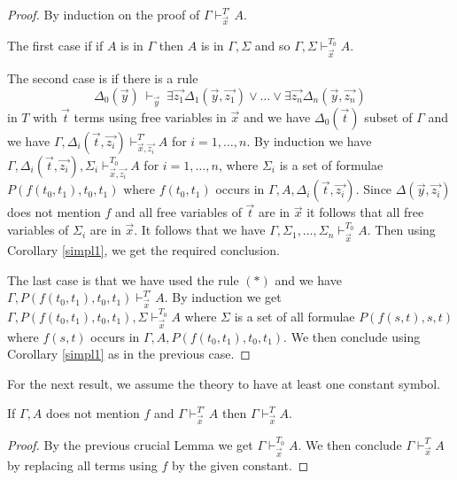 \documentclass[10pt,a4paper]{article}
\begin{document}
\begin{proof}
By induction on the proof of $\Gamma\vdash_{\vec{x}}^{T'} A$.

\medskip

 The first case if if $A$ is in $\Gamma$ then $A$ is in $\Gamma,\Sigma$ and so 
$\Gamma,\Sigma\vdash_{\vec{x}}^{T_0} A$.

\medskip

 The second case is if there is a rule
$$
\Delta_0(\vec{y})~\vdash_{\vec{y}}~
\exists \vec{z_1}\Delta_1(\vec{y},\vec{z_1})\vee\dots\vee\exists \vec{z_n}\Delta_n(\vec{y},\vec{z_n})
$$
in $T$ with $\vec{t}$ terms using free variables in $\vec{x}$ and
we have $\Delta_0(\vec{t})$ subset of $\Gamma$ and we have
$\Gamma,\Delta_i(\vec{t},\vec{z_i})\vdash_{\vec{x},\vec{z_i}}^{T'} A$ for $i=1,\dots,n$.
By induction we have $\Gamma,\Delta_i(\vec{t},\vec{z_i}), \Sigma_i\vdash_{\vec{x},\vec{z_i}}^{T_0} A$
for $i = 1,\dots,n$, where $\Sigma_i$ is a set of formulae $P(f(t_0,t_1),t_0,t_1)$ where
$f(t_0,t_1)$ occurs in $\Gamma,A,\Delta_i(\vec{t},\vec{z_i})$.
Since $\Delta(\vec{y},\vec{z_i})$ does not mention $f$ and all free variables of $\vec{t}$ are
in $\vec{x}$ it follows that all free variables of $\Sigma_i$ are in $\vec{x}$.
It follows that we have
$\Gamma,\Sigma_1,\dots,\Sigma_n\vdash_{\vec{x}}^{T_0} A$.
Then using Corollary \ref{simpl1}, we get the required conclusion.

\medskip

 The last case is that we have used the rule $(*)$ and
we have $\Gamma,P(f(t_0,t_1),t_0,t_1)\vdash_{\vec{x}}^{T'} A$. By induction we get
$\Gamma,P(f(t_0,t_1),t_0,t_1),\Sigma \vdash_{\vec{x}}^{T_0} A$ where
$\Sigma$ is a set of all formulae $P(f(s,t),s,t)$ where $f(s,t)$ occurs
in $\Gamma,A,P(f(t_0,t_1),t_0,t_1)$. We then conclude using Corollary \ref{simpl1} as in the
previous case.
\end{proof}

 For the next result, we assume the theory to have at least one constant symbol.

\begin{theorem}
If $\Gamma,A$ does not mention $f$ and $\Gamma\vdash_{\vec{x}}^{T'} A$ then
$\Gamma\vdash_{\vec{x}}^T A$.
\end{theorem}

\begin{proof}
By the previous crucial Lemma we get $\Gamma\vdash_{\vec{x}}^{T_0} A$. We then conclude
$\Gamma\vdash_{\vec{x}}^T A$ by replacing all terms using $f$ by the given constant.
\end{proof}
\end{document}
